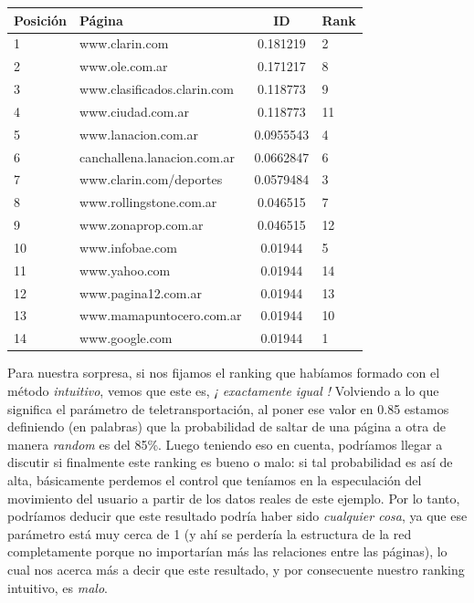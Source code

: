 \begin{center}
    \begin{tabular}{| l | l | c | l|}
    \hline
        Posición & Página & ID & Rank  \\ \hline
1 &  www.clarin.com & 0.181219 & 2 \\ \hline   
2 & www.ole.com.ar &  0.171217 & 8 \\ \hline   
3 & www.clasificados.clarin.com & 0.118773 & 9 \\ \hline   
4 & www.ciudad.com.ar & 0.118773 & 11 \\ \hline   
5 & www.lanacion.com.ar & 0.0955543 & 4\\ \hline   
6 & canchallena.lanacion.com.ar & 0.0662847 & 6 \\ \hline   
7 & www.clarin.com/deportes & 0.0579484 & 3 \\ \hline   
8 & www.rollingstone.com.ar & 0.046515 & 7 \\ \hline   
9 & www.zonaprop.com.ar &  0.046515 & 12 \\ \hline   
10 & www.infobae.com &  0.01944 & 5 \\ \hline   
11 & www.yahoo.com & 0.01944 & 14 \\ \hline   
12 & www.pagina12.com.ar & 0.01944 & 13 \\ \hline   
13 &  www.mamapuntocero.com.ar & 0.01944 & 10\\ \hline   
14 &  www.google.com & 0.01944 & 1 \\ \hline   
    \end{tabular}
\end{center}

Para nuestra sorpresa, si nos fijamos el ranking que habíamos formado con el método \textit{intuitivo}, vemos que este es, \textit{¡ exactamente igual !} Volviendo a lo que significa el parámetro de teletransportación, al poner ese valor en 0.85 estamos definiendo (en palabras) que la probabilidad de saltar de una página a otra de manera \textit{random} es del 85\%. Luego teniendo eso en cuenta, podríamos llegar a discutir si finalmente este ranking es bueno o malo: si tal probabilidad es así de alta, básicamente perdemos el control que teníamos en la especulación del movimiento del usuario a partir de los datos reales de este ejemplo. Por lo tanto, podríamos deducir que este resultado podría haber sido \textit{cualquier cosa}, ya que ese parámetro está muy cerca de 1 (y ahí se perdería la estructura de la red completamente porque no importarían más las relaciones entre las páginas), lo cual nos acerca más a decir que este resultado, y por consecuente nuestro ranking intuitivo, es \textit{malo}.

